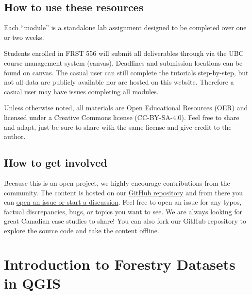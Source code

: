 \documentclass[
  letterpaper,
]{book}
\begin{document}
\hypertarget{how-to-use-these-resources}{%
\section*{How to use these resources}\label{how-to-use-these-resources}}


Each ``module'' is a standalone lab assignment designed to be completed
over one or two weeks.

Students enrolled in FRST 556 will submit all deliverables through via
the UBC course management system (canvas). Deadlines and submission
locations can be found on canvas. The casual user can still complete the
tutorials step-by-step, but not all data are publicly available nor are
hosted on this website. Therefore a casual user may have issues
completing all modules.

Unless otherwise noted, all materials are Open Educational Resources
(OER) and licensed under a Creative Commons license (CC-BY-SA-4.0). Feel
free to share and adapt, just be sure to share with the same license and
give credit to the author.

\hypertarget{how-to-get-involved}{%
\section*{How to get involved}\label{how-to-get-involved}}


Because this is an open project, we highly encourage contributions from
the community. The content is hosted on our
\href{https://github.com/ubc-geomatics-community-of-practice/GEM511-Advanced-GIS-for-Environmental-Management}{GitHub
repository} and from there you can
\href{https://github.com/ubc-geomatics-community-of-practice/GEM511-Advanced-GIS-for-Environmental-Management/issues/new}{open
an issue or start a discussion}. Feel free to open an issue for any
typos, factual discrepancies, bugs, or topics you want to see. We are
always looking for great Canadian case studies to share! You can also
fork our GitHub repository to explore the source code and take the
content offline.


\hypertarget{terrain-spatial-interpolation}{%
\chapter{Introduction to Forestry Datasets in
QGIS}\label{terrain-spatial-interpolation}}
\end{document}
